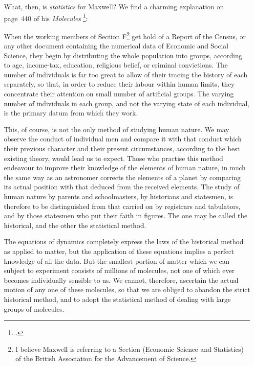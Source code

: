 \documentclass[\ifafour a4paper,12pt,\else a5paper,10pt,\fi%
onecolumn,oneside,article,%
british%
]{memoir}
\theoremstyle{remark}
\theoremstyle{innote}
\newcommand*{\citey}{\footcites}%
\renewcommand*{\|}[1][]{\nonscript\:#1\vert\nonscript\:\mathopen{}}
\renewcommand*{\=}{\TextOrMath\texteq\eq}
\newenvironment{myquote}{\medskip\begin{adjustwidth}{\parindent}{\parindent}\small}{\end{adjustwidth}\medskip}
\begin{document}
What, then, is \emph{statistics} for Maxwell? We find a charming
explanation on page~440 of his \emph{Molecules} \citey{maxwell1873c}:
\begin{myquote}
  When the working members of Section F\footnote{I believe Maxwell is
    referring to a Section (Economic Science and Statistics) of the British
    Association for the Advancement of Science.} get hold of a Report of
  the Census, or any other document containing the numerical data of
  Economic and Social Science, they begin by distributing the whole
  population into groups, according to age, income-tax, education,
  religious belief, or criminal convictions. The number of individuals is
  far too great to allow of their tracing the history of each separately,
  so that, in order to reduce their labour within human limits, they
  concentrate their attention on small number of artificial groups. The
  varying number of individuals in each group, and not the varying state of
  each individual, is the primary datum from which they work.\par This, of
  course, is not the only method of studying human nature. We may observe
  the conduct of individual men and compare it with that conduct which
  their previous character and their present circumstances, according to
  the best existing theory, would lead us to expect. Those who practise
  this method endeavour to improve their knowledge of the elements of human
  nature, in much the same way as an astronomer corrects the elements of a
  planet by comparing its actual position with that deduced from the
  received elements. The study of human nature by parents and
  schoolmasters, by historians and statesmen, is therefore to be
  distinguished from that carried on by registrars and tabulators, and by
  those statesmen who put their faith in figures. The one may be called the
  historical, and the other the statistical method.\par The equations of
  dynamics completely express the laws of the historical method as applied
  to matter, but the application of these equations implies a perfect
  knowledge of all the data. But the smallest portion of matter which we
  can subject to experiment consists of millions of molecules, not one of
  which ever becomes individually sensible to us. We cannot, therefore,
  ascertain the actual motion of any one of these molecules, so that we are
  obliged to abandon the strict historical method, and to adopt the
  statistical method of dealing with large groups of molecules.
\end{myquote}
\end{document}
